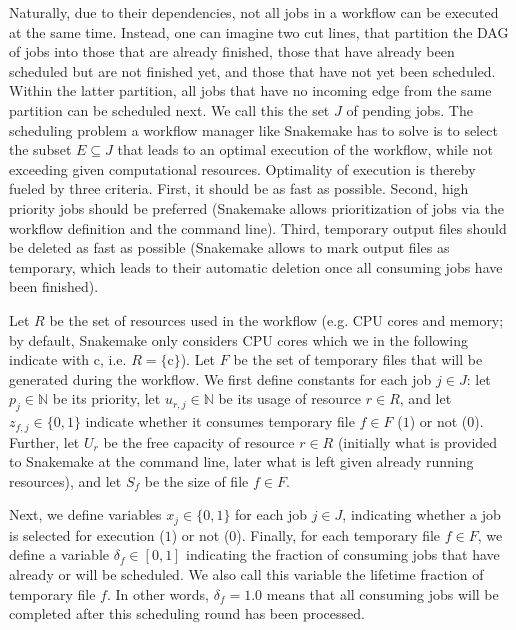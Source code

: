 \documentclass[parskip=half]{scrartcl}
\begin{document}
Naturally, due to their dependencies, not all jobs in a workflow can be executed at the same time.
Instead, one can imagine two cut lines, that partition the DAG of jobs into those that are already finished, those that have already been scheduled but are not finished yet, and those that have not yet been scheduled.
Within the latter partition, all jobs that have no incoming edge from the same partition can be scheduled next.
We call this the set $J$ of pending jobs.
The scheduling problem a workflow manager like Snakemake has to solve is to select the subset $E \subseteq J$ that leads to an optimal execution of the workflow, while not exceeding given computational resources.
Optimality of execution is thereby fueled by three criteria.
First, it should be as fast as possible.
Second, high priority jobs should be preferred (Snakemake allows prioritization of jobs via the workflow definition and the command line).
Third, temporary output files should be deleted as fast as possible (Snakemake allows to mark output files as temporary, which leads to their automatic deletion once all consuming jobs have been finished).

\newcommand{\N}{\mathbb{N}}
\newcommand{\cores}{\text{c}}

Let $R$ be the set of resources used in the workflow (e.g. CPU cores and memory; by default, Snakemake only considers CPU cores which we in the following indicate with $\cores$, i.e. $R = \{\cores\}$).
Let $F$ be the set of temporary files that will be generated during the workflow.
We first define constants for each job $j \in J$: let $p_j \in \N$ be its priority, let $u_{r,j} \in \N$ be its usage of resource $r \in R$, and let $z_{f,j} \in \{0,1\}$ indicate whether it consumes temporary file $f \in F$ ($1$) or not ($0$).
Further, let $U_r$ be the free capacity of resource $r \in R$ (initially what is provided to Snakemake at the command line, later what is left given already running resources), and let $S_f$ be the size of file $f \in F$.

Next, we define variables $x_j \in \{0,1\}$ for each job $j \in J$, indicating whether a job is selected for execution ($1$) or not ($0$).
Finally, for each temporary file $f \in F$, we define a variable $\delta_f \in [0,1]$ indicating the fraction of consuming jobs that have already or will be scheduled.
We also call this variable the lifetime fraction of temporary file $f$.
In other words, $\delta_f = 1.0$ means that all consuming jobs will be completed after this scheduling round has been processed.
\end{document}
